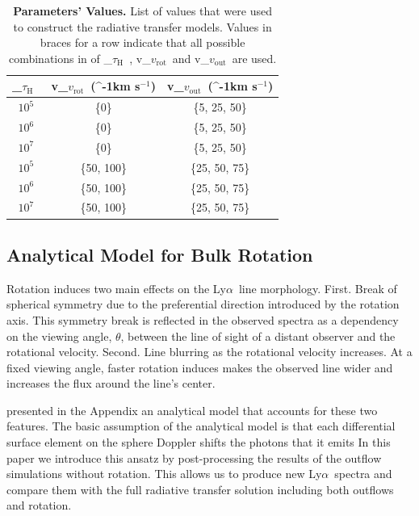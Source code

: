 \documentclass[a4paper,fleqn,usenatbib]{mnras}
\newcommand{\lya}{\ifmmode{{\rm Ly}\alpha}\else Ly$\alpha$\ \fi}
\newcommand{\kms}{\ifmmode\mathrm{km\ s}^{-1}\else km s$^{-1}$\fi}
\newcommand{\vrot}{\ifmmode\mathrm v_{\mathrm{rot}}\else $v_{\mathrm{rot}}$~\fi}
\newcommand{\vout}{\ifmmode\mathrm v_{\mathrm{out}}\else $v_{\mathrm{out}}$~\fi}
\newcommand{\tauh}{\ifmmode\mathrm \tau_{\mathrm{H}}\else $\tau_{\mathrm{H}}$~\fi}
\begin{document}
\begin{table}
  \begin{center}
    \begin{tabular}{|c|c|c|}
      \hline
      \tauh & \vrot (\kms) & \vout (\kms) \\
      \hline
      $10^5$ & \{0\} & \{5, 25, 50\} \\
      $10^6$ & \{0\} & \{5, 25, 50\}\\
      $10^7$ & \{0\} & \{5, 25, 50\}\\
      $10^5$ & \{50, 100\} & \{25, 50, 75\} \\
      $10^6$ & \{50, 100\} & \{25, 50, 75\}\\
      $10^7$ & \{50, 100\} & \{25, 50, 75\}\\
      \hline    
    \end{tabular}
  \end{center}
  \caption{\textbf{Parameters' Values.} List of values that were used
    to construct the radiative transfer models. Values in braces
    for a row indicate that all possible combinations in of
    \tauh, \vrot and \vout are used.}
  \label{tab:values}
\end{table}


\subsection{Analytical Model for Bulk Rotation}

Rotation induces two main effects on the \lya line morphology.
First. Break of spherical symmetry due to the 
preferential direction introduced by the rotation axis.
This symmetry break is reflected in the observed spectra as a
dependency on the viewing angle, $\theta$, between the line of sight
of a distant observer and the rotational velocity.    
Second. Line blurring as the rotational velocity increases.
At a fixed viewing angle, faster rotation induces makes the observed
line wider and increases the flux around the line's center. 

\cite{Garavito14} presented in the Appendix an analytical model that
accounts for these two features.
The basic assumption of the analytical model is that each
differential surface element on the sphere Doppler shifts the photons
that it emits
In this paper we introduce this ansatz by post-processing the results
of the outflow simulations without rotation.
This allows us to produce new \lya spectra and compare them with the
full radiative transfer solution including both outflows and
rotation. 
\end{document}
